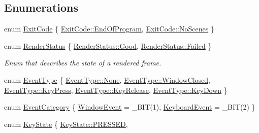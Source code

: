 \subsection*{Enumerations}
\begin{DoxyCompactItemize}
\item 
enum \hyperlink{namespacepcs_a18473e98e91ab823330de05ab508a5bb}{Exit\+Code} \{ \hyperlink{namespacepcs_a18473e98e91ab823330de05ab508a5bba83a7a1ef57838501fbf6c362184cf38c}{Exit\+Code\+::\+End\+Of\+Program}, 
\hyperlink{namespacepcs_a18473e98e91ab823330de05ab508a5bba8c553e1073c5a910fc146f2ec6fd9487}{Exit\+Code\+::\+No\+Scenes}
 \}
\item 
enum \hyperlink{namespacepcs_a979c2971659f1655c7ebe27752b8a9a0}{Render\+Status} \{ \hyperlink{namespacepcs_a979c2971659f1655c7ebe27752b8a9a0a0c6ad70beb3a7e76c3fc7adab7c46acc}{Render\+Status\+::\+Good}, 
\hyperlink{namespacepcs_a979c2971659f1655c7ebe27752b8a9a0ad7c8c85bf79bbe1b7188497c32c3b0ca}{Render\+Status\+::\+Failed}
 \}\begin{DoxyCompactList}\small\item\em Enum that describes the state of a rendered frame. \end{DoxyCompactList}
\item 
enum \hyperlink{namespacepcs_a12954f53e3d7d6a8765fd723e1ce8db4}{Event\+Type} \{ \newline
\hyperlink{namespacepcs_a12954f53e3d7d6a8765fd723e1ce8db4a6adf97f83acf6453d4a6a4b1070f3754}{Event\+Type\+::\+None}, 
\hyperlink{namespacepcs_a12954f53e3d7d6a8765fd723e1ce8db4a7c87dff2b968b5c85baf1def063c776d}{Event\+Type\+::\+Window\+Closed}, 
\hyperlink{namespacepcs_a12954f53e3d7d6a8765fd723e1ce8db4a65a1aa093fcf3acd50b318f1942c02f5}{Event\+Type\+::\+Key\+Press}, 
\hyperlink{namespacepcs_a12954f53e3d7d6a8765fd723e1ce8db4a17ee17cec34ff017c382ba1ce8dc4cdc}{Event\+Type\+::\+Key\+Release}, 
\newline
\hyperlink{namespacepcs_a12954f53e3d7d6a8765fd723e1ce8db4acfd07bf1effd88bca04a12a087777354}{Event\+Type\+::\+Key\+Down}
 \}
\item 
enum \hyperlink{namespacepcs_a3538ef524602fc09ddb40acc72480c60}{Event\+Category} \{ \hyperlink{namespacepcs_a3538ef524602fc09ddb40acc72480c60a5fb31ca24b241c5c6af3df6930ef53ba}{Window\+Event} = \+\_\+\+B\+IT(1), 
\hyperlink{namespacepcs_a3538ef524602fc09ddb40acc72480c60a26cd4d5fcc5bb943efa4fd4ce0a69386}{Keyboard\+Event} = \+\_\+\+B\+IT(2)
 \}
\item 
enum \hyperlink{namespacepcs_a74212420ef246b051e11d561089ed547}{Key\+State} \{ \hyperlink{namespacepcs_a74212420ef246b051e11d561089ed547a5381dc876ab002103a027265bc14ae52}{Key\+State\+::\+P\+R\+E\+S\+S\+ED}, 

\end{DoxyCompactItemize}
